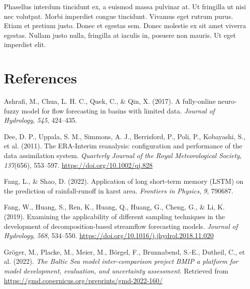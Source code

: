 \documentclass[
]{agujournal2019}
\newlength{\cslhangindent}
\newlength{\cslentryspacingunit} %
\newenvironment{CSLReferences}[2] %
 {%
  \setlength{\parindent}{0pt}
  \ifodd #1
  \let\oldpar\par
  \def\par{\hangindent=\cslhangindent\oldpar}
  \fi
  \setlength{\parskip}{#2\cslentryspacingunit}
 }%
 {}
\begin{document}
Phasellus interdum tincidunt ex, a euismod massa pulvinar at. Ut
fringilla ut nisi nec volutpat. Morbi imperdiet congue tincidunt.
Vivamus eget rutrum purus. Etiam et pretium justo. Donec et egestas sem.
Donec molestie ex sit amet viverra egestas. Nullam justo nulla,
fringilla at iaculis in, posuere non mauris. Ut eget imperdiet elit.

\hypertarget{references}{%
\section*{References}\label{references}}

\hypertarget{refs}{}
\begin{CSLReferences}{1}{0}
\vspace{1em}

\leavevmode{}%
Ashrafi, M., Chua, L. H. C., Quek, C., \& Qin, X. (2017). A fully-online
neuro-fuzzy model for flow forecasting in basins with limited data.
\emph{Journal of Hydrology}, \emph{545}, 424--435.

\leavevmode{}%
Dee, D. P., Uppala, S. M., Simmons, A. J., Berrisford, P., Poli, P.,
Kobayashi, S., et al. (2011). The ERA-Interim reanalysis: configuration
and performance of the data assimilation system. \emph{Quarterly Journal
of the Royal Meteorological Society}, \emph{137}(656), 553--597.
\url{https://doi.org/10.1002/qj.828}

\leavevmode{}%
Fang, L., \& Shao, D. (2022). Application of long short-term memory
(LSTM) on the prediction of rainfall-runoff in karst area.
\emph{Frontiers in Physics}, \emph{9}, 790687.

\leavevmode{}%
Fang, W., Huang, S., Ren, K., Huang, Q., Huang, G., Cheng, G., \& Li, K.
(2019). Examining the applicability of different sampling techniques in
the development of decomposition-based streamflow forecasting models.
\emph{Journal of Hydrology}, \emph{568}, 534--550.
\url{https://doi.org/10.1016/j.jhydrol.2018.11.020}

\leavevmode{}%
Gröger, M., Placke, M., Meier, M., Börgel, F., Brunnabend, S.-E.,
Dutheil, C., et al. (2022). \emph{The Baltic Sea model inter-comparison
project BMIP {\textendash} a platform for model development, evaluation,
and uncertainty assessment}. Retrieved from
\url{https://gmd.copernicus.org/preprints/gmd-2022-160/}


\end{CSLReferences}
\end{document}
